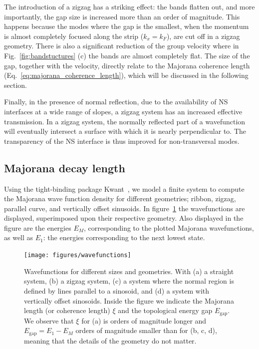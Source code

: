 			The introduction of a zigzag has a striking effect: the bands flatten out, and more importantly, the gap size is increased more than an order of magnitude.
			This happens because the modes where the gap is the smallest, when the momentum is almost completely focused along the strip ($k_x=k_F$), are cut off in a zigzag geometry.
			There is also a significant reduction of the group velocity where in Fig.~\ref{fig:bandstuctures} (c) the bands are almost completely flat.
			The size of the gap, together with the velocity, directly relate to the Majorana coherence length (Eq.~\eqref{eq:majorana_coherence_length}), which will be discussed in the following section.

			Finally, in the presence of normal reflection, due to the availability of NS interfaces at a wide range of slopes, a zigzag system has an increased effective transmission.
			In a zigzag system, the normally reflected part of a wavefunction will eventually intersect a surface with which it is nearly perpendicular to.
			The transparency of the NS interface is thus improved for non-transversal modes.

		\subsection{Majorana decay length}

			Using the tight-binding package Kwant~\cite{groth_kwant:_2014}, we model a finite system to compute the Majorana wave function density for different geometries; ribbon, zigzag, parallel curve, and vertically offset sinusoids.
			In figure~\ref{fig:wavefunctions} the wavefunctions are displayed, superimposed upon their respective geometry.
			Also displayed in the figure are the energies $E_M$, corresponding to the plotted Majorana wavefunctions, as well as $E_1$: the energies corresponding to the next lowest state.

			\begin{figure}[!htb]
			\centering
			\texttt{[image: figures/wavefunctions]}
			\caption{Wavefunctions for different sizes and geometries.
			With (a) a straight system, (b) a zigzag system, (c) a system where the normal region is defined by lines parallel to a sinosoid, and (d) a system with vertically offset sinosoids.
			Inside the figure we indicate the Majorana length (or coherence length) $\xi$ and the topological energy gap $E_\textrm{gap}$.
			We observe that $\xi$ for (a) is orders of magnitude longer and $E_\textrm{gap} = E_\textrm{1} - E_M$ orders of magnitude smaller than for (b, c, d), meaning that the details of the geometry do not matter.
			\label{fig:wavefunctions}}
			\end{figure}

